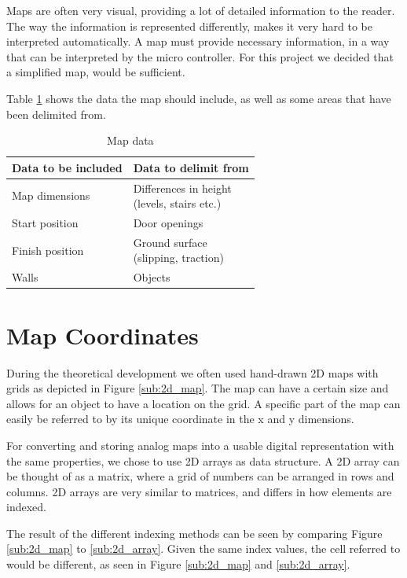 Maps are often very visual, providing a lot of detailed information to the reader.
The way the information is represented differently,
makes it very hard to be interpreted automatically.
A map must provide necessary information,
in a way that can be interpreted by the micro controller.
For this project we decided that a simplified map, would be sufficient.

Table \ref{table:map_data} shows the data the map should include,
as well as some areas that have been delimited from.

\begin{table}[h!]
	\centering
	\caption{Map data}
	\begin{tabular}{|p{}||p{}|}
		\hline
		Data to be included & Data to delimit from \\ 
		\hline
		Map dimensions 		& \parbox[t]{0.4\textwidth}{Differences in height\\(levels, stairs etc.)}\\
		\hline
		Start position 		& Door openings \\
		\hline
		Finish position 	& \parbox[t]{0.4\textwidth}{Ground surface\\(slipping, traction)} \\
		\hline
		Walls 				& Objects\\
		\hline
	\end{tabular}
	\label{table:map_data}
\end{table}


\section{Map Coordinates}
\label{sec:map_coordinates} %
During the theoretical development we often used hand-drawn 2D maps with grids as depicted in Figure \ref{sub:2d_map}. The map can have a certain size and allows for an object to have a location on the grid. A specific part of the map can easily be referred to by its unique coordinate in the x and y dimensions. 

For converting and storing analog maps into a usable digital representation with the same properties, we chose to use 2D arrays as data structure. A 2D array can be thought of as a matrix, where a grid of numbers can be arranged in rows and columns. 2D arrays are very similar to matrices, and differs in how elements are indexed.

The result of the different indexing methods can be seen by comparing Figure \ref{sub:2d_map} to \ref{sub:2d_array}. Given the same index values, the cell referred to would be different, as seen in  Figure \ref{sub:2d_map} and \ref{sub:2d_array}.

